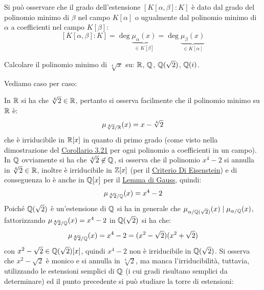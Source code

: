 \documentclass[11pt]{scrartcl}
\begin{document}
\begin{remark}
Si può osservare che il grado dell'estensione $[K[\alpha,\beta]:K]$ è dato dal grado del polinomio minimo di $\beta$ nel campo $K[\alpha]$ o ugualmente dal polinomio minimo di $\alpha$ a coefficienti nel campo $K[\beta]$:
	\[ [K[\alpha,\beta]:K] = \deg \underbrace{\mu_\alpha(x)}_{\in K[\beta]} = \deg \underbrace{\mu_\beta(x)}_{\in K[\alpha]}
	\]
\end{remark}

\begin{exercise}
Calcolare il polinomio minimo di $\sqrt[4]{x}$ su: $\mathbb R$, $\mathbb Q$, $\mathbb Q(\sqrt 2)$, $\mathbb Q(i)$.
\end{exercise}

\begin{soln}
Vediamo caso per caso:
	\begin{itemize}
	\ii In $\mathbb R$ si ha che $\sqrt[4]2 \in \mathbb R$, pertanto si osserva facilmente che il polinomio minimo su $\mathbb R$ è:
		\[ \mu_{{\sqrt[4]2}/{\mathbb R}}(x) = x - \sqrt[4]2
		\]
		che è irriducibile in $\mathbb R[x]$ in quanto di primo grado (come visto nella dimostrazione del \hyperref[p:3.21]{Corollario 3.21} per ogni polinomio a coefficienti in un campo).
	\ii In $\mathbb Q$ ovviamente si ha che $\sqrt[4]2 \not\in \mathbb Q$, si osserva che il polinomio $x^4-2$ si annulla in $\sqrt[4]2 \in \mathbb R$, inoltre è irriducibile in $\mathbb Z[x]$ (per il \hyperref[p:esien]{Criterio Di Eisenstein}) e di conseguenza lo è anche in $\mathbb Q[x]$ per il \hyperref[p:Gauss]{Lemma di Gauss}, quindi:
		\[ \mu_{{\sqrt[4]2}/{\mathbb Q}}(x) = x^4 - 2
		\]
	\ii Poiché $\mathbb Q(\sqrt 2)$ è un'estensione di $\mathbb Q$ si ha in generale che $\mu_{\alpha/\mathbb Q(\sqrt 2)}(x) \mid \mu_{\alpha/\mathbb Q}(x)$, fattorizzando $\mu_{{\sqrt[4]2}/{\mathbb Q}}(x) = x^4 - 2$ in $\mathbb Q(\sqrt 2)$ si ha che:
		\[ \mu_{{\sqrt[4]2}/{\mathbb Q}}(x) = x^4 - 2 = (x^2 - \sqrt 2)(x^2 + \sqrt 2)
		\]
		con $x^2-\sqrt 2 \in \mathbb Q(\sqrt 2)[x]$, quindi $x^4-2$ non è irriducibile in $\mathbb Q(\sqrt 2)$. Si osserva che $x^2-\sqrt 2$ è monico e si annulla in $\sqrt[4]2$, ma manca l'irriducibilità, tuttavia, utilizzando le estensioni semplici di $\mathbb Q$ (i cui gradi risultano semplici da determinare) ed il punto precedente si può studiare la torre di estensioni:
			\begin{center}
\end{center}
\end{itemize}
\end{soln}
\end{document}
